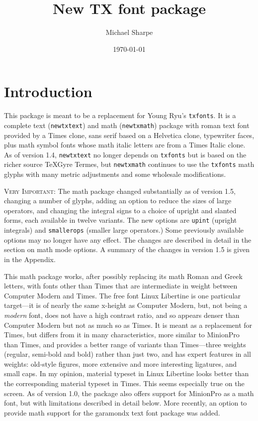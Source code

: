 \documentclass[11pt]{article}
\title{New TX font package}
\author{Michael Sharpe}
\date{\today}  %
\theoremstyle{oldplain}
\theoremstyle{plain}
\begin{document}
\maketitle
\section{Introduction}
This package is meant to be a replacement for Young Ryu's {\tt txfonts}. It is  a complete text ({\tt newtxtext}) and math ({\tt newtxmath}) package with roman text font provided by  a Times clone, sans serif based on a \textsf{Helvetica} clone, typewriter faces, plus math symbol fonts whose math italic letters are from a Times Italic clone. As of version 1.4, {\tt newtxtext} no longer depends on {\tt txfonts} but is based on the richer source \textsf{TeXGyre Termes}, but {\tt newtxmath} continues to use the {\tt txfonts} math glyphs with many metric adjustments and some wholesale modifications.

\textsc{Very Important:} The math package changed substantially as of version 1.5, changing a number of glyphs, adding an option to reduce the sizes of large operators, and changing the integral signs to a choice of upright and slanted forms, each available in twelve variants. The new options are {\tt upint} (upright integrals) and {\tt smallerops} (smaller large operators.) Some previously available options may no longer have any effect. The changes are described in detail in the section on math mode options. A summary of the changes in version 1.5 is given in the Appendix.



This math package works, after possibly replacing its math Roman and Greek letters, with fonts other than Times that are intermediate in weight between Computer Modern and Times. The free font Linux Libertine is one particular target---it is of nearly the same x-height as Computer Modern, but, not being a \emph{modern} font, does not have a high contrast ratio, and so appears  denser than Computer Modern but not as much so as Times. It is meant as a replacement for Times, but  differs from it in many characteristics, more similar to MinionPro than Times, and provides a better range of variants than Times---three weights (regular, semi-bold and bold) rather than just two, and has expert features in all weights: old-style figures, more extensive and more interesting ligatures,  and  small caps. In my opinion, material typeset in Linux Libertine looks better than the corresponding material typeset in Times. This seems especially true on the screen. As of version 1.0, the package also offers support for MinionPro as a math font, but with limitations described in detail below. More recently, an option to provide math support for the \textsf{garamondx} text font package was added.
\end{document}
